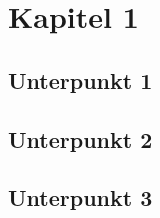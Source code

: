 \section{Kapitel 1}
\subsection{Unterpunkt 1}
\blindtext

\subsection{Unterpunkt 2}
\blindtext

\subsection{Unterpunkt 3}
\blindtext
\cite[Quellenbeschreibung]{001}
